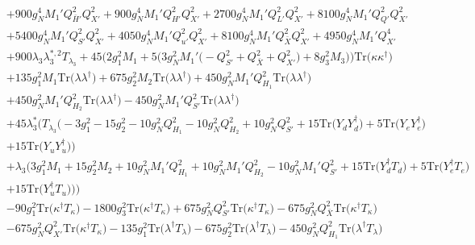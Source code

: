 {\begin{align}
 &+900 g_{N}^{4} M_1' Q_{\bar{H}'}^{2} Q_{X'}^{2} +900 g_{N}^{4} M_1' Q_{H'}^{2} Q_{X'}^{2} +2700 g_{N}^{4} M_1' Q_{L'}^{2} Q_{X'}^{2} +8100 g_{N}^{4} M_1' Q_{Q'}^{2} Q_{X'}^{2} \nonumber \\ 
 &+5400 g_{N}^{4} M_1' Q_{S'}^{2} Q_{X'}^{2} +4050 g_{N}^{4} M_1' Q_{u'}^{2} Q_{X'}^{2} +8100 g_{N}^{4} M_1' Q_{\bar{X}}^{2} Q_{X'}^{2} +4950 g_{N}^{4} M_1' Q_{X'}^{4} \nonumber \\ 
 &+900 \lambda_3 \lambda_{3}^{*,2} T_{\lambda_3} +45 \Big(2 g_{1}^{2} M_1  + 5 \Big(3 g_{N}^{2} M_1' \Big(- Q_{S'}^{2}  + Q_{\bar{X}}^{2} + Q_{X'}^{2}\Big) + 8 g_{3}^{2} M_3 \Big)\Big)\mbox{Tr}\Big({\kappa  \kappa^{\dagger}}\Big) \nonumber \\ 
 &+135 g_{1}^{2} M_1 \mbox{Tr}\Big({\lambda  \lambda^{\dagger}}\Big) +675 g_{2}^{2} M_2 \mbox{Tr}\Big({\lambda  \lambda^{\dagger}}\Big) +450 g_{N}^{2} M_1' Q_{H_1}^{2} \mbox{Tr}\Big({\lambda  \lambda^{\dagger}}\Big) \nonumber \\ 
 &+450 g_{N}^{2} M_1' Q_{H_2}^{2} \mbox{Tr}\Big({\lambda  \lambda^{\dagger}}\Big) -450 g_{N}^{2} M_1' Q_{S'}^{2} \mbox{Tr}\Big({\lambda  \lambda^{\dagger}}\Big) \nonumber \\ 
 &+45 \lambda_3^* \Big(T_{\lambda_3} \Big(-3 g_{1}^{2} -15 g_{2}^{2} -10 g_{N}^{2} Q_{H_1}^{2} -10 g_{N}^{2} Q_{H_2}^{2} +10 g_{N}^{2} Q_{S'}^{2} +15 \mbox{Tr}\Big({Y_d  Y_{d}^{\dagger}}\Big) +5 \mbox{Tr}\Big({Y_e  Y_{e}^{\dagger}}\Big) \nonumber \\ 
 &+15 \mbox{Tr}\Big({Y_u  Y_{u}^{\dagger}}\Big) \Big)\nonumber \\ 
 &+\lambda_3 \Big(3 g_{1}^{2} M_1 +15 g_{2}^{2} M_2 +10 g_{N}^{2} M_1' Q_{H_1}^{2} +10 g_{N}^{2} M_1' Q_{H_2}^{2} -10 g_{N}^{2} M_1' Q_{S'}^{2} +15 \mbox{Tr}\Big({Y_{d}^{\dagger}  T_d}\Big) +5 \mbox{Tr}\Big({Y_{e}^{\dagger}  T_e}\Big) \nonumber \\ 
 &+15 \mbox{Tr}\Big({Y_{u}^{\dagger}  T_u}\Big) \Big)\Big)\nonumber \\ 
 &-90 g_{1}^{2} \mbox{Tr}\Big({\kappa^{\dagger}  T_{\kappa}}\Big) -1800 g_{3}^{2} \mbox{Tr}\Big({\kappa^{\dagger}  T_{\kappa}}\Big) +675 g_{N}^{2} Q_{S'}^{2} \mbox{Tr}\Big({\kappa^{\dagger}  T_{\kappa}}\Big) -675 g_{N}^{2} Q_{\bar{X}}^{2} \mbox{Tr}\Big({\kappa^{\dagger}  T_{\kappa}}\Big) \nonumber \\ 
 &-675 g_{N}^{2} Q_{X'}^{2} \mbox{Tr}\Big({\kappa^{\dagger}  T_{\kappa}}\Big) -135 g_{1}^{2} \mbox{Tr}\Big({\lambda^{\dagger}  T_{\lambda}}\Big) -675 g_{2}^{2} \mbox{Tr}\Big({\lambda^{\dagger}  T_{\lambda}}\Big) -450 g_{N}^{2} Q_{H_1}^{2} \mbox{Tr}\Big({\lambda^{\dagger}  T_{\lambda}}\Big) \nonumber \\ 

\end{align}}

